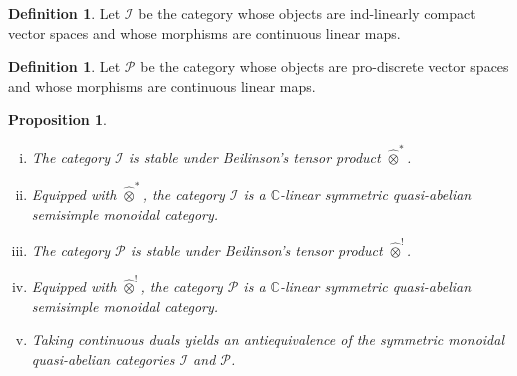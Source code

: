 \documentclass[12pt,reqno]{amsart}
\newtheorem{prop}[thm]{Proposition}
\theoremstyle{definition}
\newtheorem{defn}[thm]{Definition}
\theoremstyle{remark}
\begin{document}
    \begin{defn}
        Let $\mathcal{I}$ be the category whose objects are ind-linearly compact vector spaces and whose morphisms are continuous linear maps.
    \end{defn}

    \begin{defn}
        Let $\mathcal{P}$ be the category whose objects are pro-discrete vector spaces and whose morphisms are continuous linear maps.
    \end{defn}

    \begin{prop}\label{prop:IP}
        \begin{enumerate}[(i)]
            \item The category $\mathcal{I}$ is stable under Beilinson's tensor product $\widehat{\otimes}^\ast$. 
            \item Equipped with $\widehat{\otimes}^\ast$, the category $\mathcal{I}$ is a 
            $\mathbb{C}$-linear symmetric quasi-abelian semisimple monoidal category.
            \item The category $\mathcal{P}$ is stable under Beilinson's tensor product $\widehat{\otimes}^!$. 
            \item Equipped with $\widehat{\otimes}^!$, the category $\mathcal{P}$ is a 
            $\mathbb{C}$-linear symmetric quasi-abelian semisimple monoidal category.
            \item Taking continuous duals yields an antiequivalence of the symmetric monoidal quasi-abelian categories $\mathcal{I}$ and $\mathcal{P}$.
        \end{enumerate}
    \end{prop}
\end{document}
